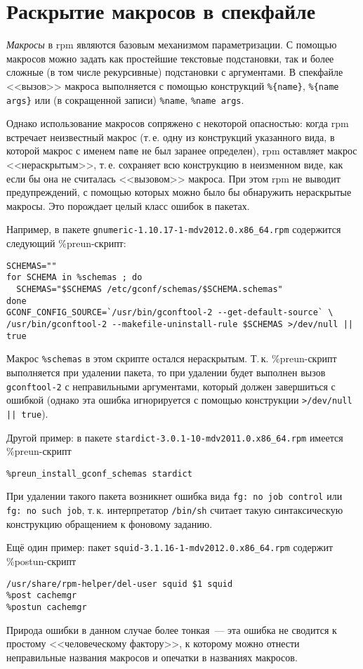 \documentclass[russian,a4paper,12pt,titlepage]{article}
\begin{document}
\section{Раскрытие макросов в спекфайле}
\textit{Макросы} в rpm являются базовым механизмом параметризации.  С помощью
макросов можно задать как простейшие текстовые подстановки, так и более сложные
(в том числе рекурсивные) подстановки с аргументами.  В спекфайле <<вызов>> макроса
выполняется с помощью конструкций \verb|%{name}|, \verb|%{name args}| или (в сокращенной записи)
\verb|%name|, \verb|%name args|.

Однако использование макросов сопряжено с некоторой опасностью: когда rpm встречает неизвестный макрос
(т.\,е. одну из конструкций указанного вида, в которой макрос с именем \verb|name| не был заранее определен),
rpm оставляет макрос <<нераскрытым>>, т.\,е. сохраняет всю конструкцию в неизменном виде, как если бы она не считалась
<<вызовом>> макроса.  При этом rpm не выводит предупреждений, с помощью которых можно было бы обнаружить
нераскрытые макросы.  Это порождает целый класс ошибок в пакетах.

Например, в пакете \verb|gnumeric-1.10.17-1-mdv2012.0.x86_64.rpm| содержится следующий \%preun-скрипт:
\begin{verbatim}
SCHEMAS=""
for SCHEMA in %schemas ; do
  SCHEMAS="$SCHEMAS /etc/gconf/schemas/$SCHEMA.schemas"
done
GCONF_CONFIG_SOURCE=`/usr/bin/gconftool-2 --get-default-source` \
/usr/bin/gconftool-2 --makefile-uninstall-rule $SCHEMAS >/dev/null || true
\end{verbatim}
Макрос \verb|%schemas| в этом скрипте остался нераскрытым.  Т.\,к. \%preun-скрипт
выполняется при удалении пакета, то при удалении будет выполнен вызов \verb|gconftool-2|
с неправильными аргументами, который должен завершиться с ошибкой (однако эта ошибка игнорируется
с помощью конструкции \texttt{>/dev/null || true}).

Другой пример: в пакете \verb|stardict-3.0.1-10-mdv2011.0.x86_64.rpm| имеется \%preun-скрипт
\begin{verbatim}
%preun_install_gconf_schemas stardict
\end{verbatim}
При удалении такого пакета возникнет ошибка вида \texttt{fg: no job control} или \texttt{fg: no such job},
т.\,к. интерпретатор \verb|/bin/sh| считает такую синтаксическую конструкцию обращением к фоновому заданию.

Ещё один пример: пакет \verb|squid-3.1.16-1-mdv2012.0.x86_64.rpm| содержит \%postun-скрипт
\begin{verbatim}
/usr/share/rpm-helper/del-user squid $1 squid
%post cachemgr
%postun cachemgr
\end{verbatim}
Природа ошибки в данном случае более тонкая~--- эта ошибка не сводится к простому <<человеческому фактору>>,
к которому можно отнести неправильные названия макросов и опечатки в названиях макросов.
\end{document}
